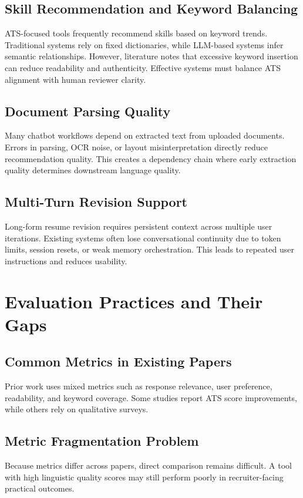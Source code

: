 \documentclass[conference]{IEEEtran}
\begin{document}
\subsection{Skill Recommendation and Keyword Balancing}
ATS-focused tools frequently recommend skills based on keyword trends. Traditional systems rely on fixed dictionaries, while LLM-based systems infer semantic relationships. However, literature notes that excessive keyword insertion can reduce readability and authenticity. Effective systems must balance ATS alignment with human reviewer clarity.

\subsection{Document Parsing Quality}
Many chatbot workflows depend on extracted text from uploaded documents. Errors in parsing, OCR noise, or layout misinterpretation directly reduce recommendation quality. This creates a dependency chain where early extraction quality determines downstream language quality.

\subsection{Multi-Turn Revision Support}
Long-form resume revision requires persistent context across multiple user iterations. Existing systems often lose conversational continuity due to token limits, session resets, or weak memory orchestration. This leads to repeated user instructions and reduces usability.

\section{Evaluation Practices and Their Gaps}
\subsection{Common Metrics in Existing Papers}
Prior work uses mixed metrics such as response relevance, user preference, readability, and keyword coverage. Some studies report ATS score improvements, while others rely on qualitative surveys.

\subsection{Metric Fragmentation Problem}
Because metrics differ across papers, direct comparison remains difficult. A tool with high linguistic quality scores may still perform poorly in recruiter-facing practical outcomes.
\end{document}
